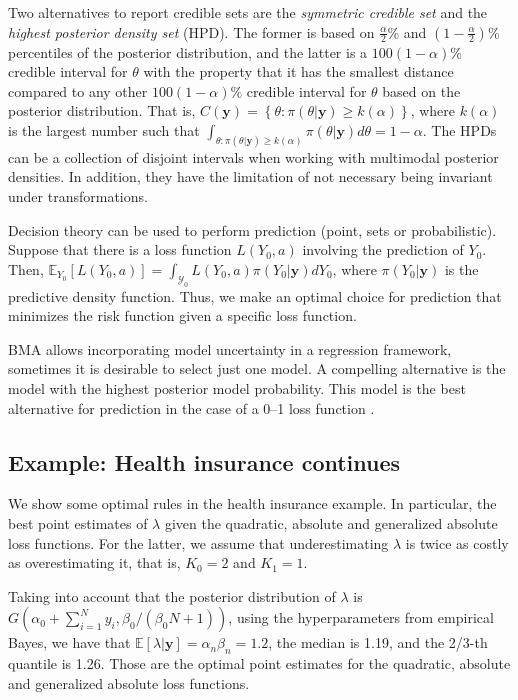 Two alternatives to report credible sets are the \textit{symmetric credible set} and the \textit{highest posterior density set} (HPD). The former is based on $\frac{\alpha}{2}$\% and $(1-\frac{\alpha}{2})$\% percentiles of the posterior distribution, and the latter is a $100(1-\alpha)\%$ credible interval for $\theta$ with the property that it has the smallest distance compared to any other $100(1-\alpha)\%$ credible interval for $\theta$ based on the posterior distribution. That is, $C(\mathbf{y})=\left\{\theta:\pi(\theta|\mathbf{y})\geq k(\alpha)\right\}$, where $k(\alpha)$ is the largest number such that $\int_{\theta:\pi(\theta|\mathbf{y})\geq k(\alpha)}\pi(\theta|\mathbf{y})d\theta=1-\alpha$. The HPDs can be a collection of disjoint intervals when working with multimodal posterior densities. In addition, they have the limitation of not necessary being invariant under transformations. 

Decision theory can be used to perform prediction (point, sets or probabilistic). Suppose that there is a loss function $L(Y_0,a)$ involving the prediction of $Y_0$. Then, $\mathbb{E}_{Y_0}[L(Y_0,a)]=\int_{\mathcal{Y}_0}L(Y_0,a)\pi(Y_0|\mathbf{y})dY_0$, where $\pi(Y_0|\mathbf{y})$ is the predictive density function. Thus, we make an optimal choice for prediction that minimizes the risk function given a specific loss function.

BMA allows incorporating model uncertainty in a regression framework, sometimes it is desirable to select just one model. A compelling alternative is the model with the highest posterior model probability. This model is the best alternative for prediction in the case of a 0--1 loss function \cite{Clyde2004}.

\subsection{Example: Health insurance continues}\label{131}

We show some optimal rules in the health insurance example. In particular, the best point estimates of $\lambda$ given the quadratic, absolute and generalized absolute loss functions. For the latter, we assume that underestimating $\lambda$ is twice as costly as overestimating it, that is, $K_0=2$ and $K_1=1$.

Taking into account that the posterior distribution of $\lambda$ is $G(\alpha_0+\sum_{i=1}^N y_i, \beta_0/(\beta_0N+1))$, using the hyperparameters from empirical Bayes, we have that $\mathbb{E}[\lambda|\mathbf{y}]=\alpha_n\beta_n=1.2$, the median is 1.19, and the 2/3-th quantile is 1.26. Those are the optimal point estimates for the quadratic, absolute and generalized absolute loss functions.


